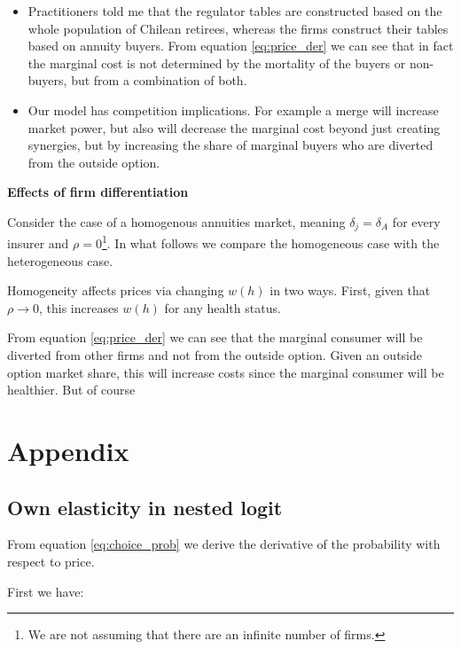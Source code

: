 \documentclass[12pt]{article}
\theoremstyle{plain}
\theoremstyle{plain}
\begin{document}
\begin{itemize}
    \item Practitioners told me that the regulator tables are constructed based on the whole population of Chilean retirees, whereas the firms construct their tables based on annuity buyers. From equation \ref{eq:price_der} we can see that in fact the marginal cost is not determined by the mortality of the buyers or non-buyers, but from a combination of both. 

    \item Our model has competition implications. For example a merge will increase market power, but also will decrease the marginal cost beyond just creating synergies, but by increasing the share of marginal buyers who are diverted from the outside option. 
\end{itemize}


\textbf{Effects of firm differentiation}

Consider the case of a homogenous  annuities market, meaning $\delta_j = \delta_A$ for every insurer and $\rho = 0$\footnote{We are not assuming that there are an infinite number of firms.}.
In what follows we compare the homogeneous case with the heterogeneous case. 

Homogeneity affects prices via changing $w(h)$ in two ways. First, given that $\rho \rightarrow 0$, this increases $w(h)$ for any health status. 



From equation \ref{eq:price_der} we can see that the marginal consumer will be diverted from other firms and not from the outside option. 
Given an outside option market share, this will increase costs since the marginal consumer will be healthier.  But of course 


 
\section{Appendix}

\subsection{Own elasticity in nested logit}\label{sec:appendix1}
From equation \ref{eq:choice_prob} we derive the derivative of the probability with respect to price. 

First we have: 
\end{document}
